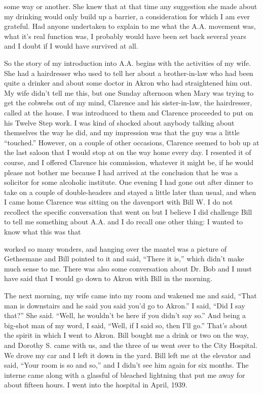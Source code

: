 \begin{biblechapter}
some way or another. She knew that at that time any suggestion she made about my drinking would only build up a barrier, a consideration for which I am ever grateful. Had anyone undertaken to explain to me what the A.A. movement was, what it’s real function was, I probably would have been set back several years and I doubt if I would have survived at all.

So the story of my introduction into A.A. begins with the activities of my wife. She had a hairdresser who used to tell her about a brother-in-law who had been quite a drinker and about some doctor in Akron who had straightened him out. My wife didn’t tell me this, but one Sunday afternoon when Mary was trying to get the cobwebs out of my mind, Clarence and his sister-in-law, the hairdresser, called at the house. I was introduced to them and Clarence proceeded to put on his Twelve Step work. I was kind of shocked about anybody talking about themselves the way he did, and my impression was that the guy was a little “touched.” However, on a couple of other occasions, Clarence seemed to bob up at the last saloon that I would stop at on the way home every day. I resented it of course, and I offered Clarence his commission, whatever it might be, if he would please not bother me because I had arrived at the conclusion that he was a solicitor for some alcoholic institute. One evening I had gone out after dinner to take on a couple of double-headers and stayed a little later than usual, and when I came home Clarence was sitting on the davenport with Bill W. I do not recollect the specific conversation that went on but I believe I did challenge Bill to tell me something about A.A. and I do recall one other thing: I wanted to know what this was that

worked so many wonders, and hanging over the mantel was a picture of Gethsemane and Bill pointed to it and said, “There it is,” which didn’t make much sense to me. There was also some conversation about Dr. Bob and I must have said that I would go down to Akron with Bill in the morning.

The next morning, my wife came into my room and wakened me and said, “That man is downstairs and he said you said you’d go to Akron.” I said, “Did I say that?” She said. “Well, he wouldn’t be here if you didn’t say so.” And being a big-shot man of my word, I said, “Well, if I said so, then I’ll go.” That’s about the spirit in which I went to Akron. Bill bought me a drink or two on the way, and Dorothy S. came with us, and the three of us went over to the City Hospital. We drove my car and I left it down in the yard. Bill left me at the elevator and said, “Your room is so and so,” and I didn’t see him again for six months. The interne came along with a glassful of bleached lightning that put me away for about fifteen hours. I went into the hospital in April, 1939.


\end{biblechapter}
